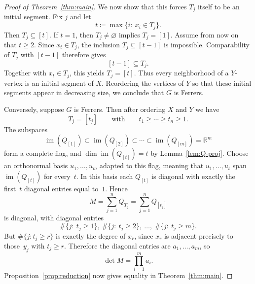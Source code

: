 \documentclass[10pt,a4paper]{amsart}
\newcommand{\RR}{\mathbb R}
\begin{document}
\begin{proof}[Proof of Theorem~\ref{thm:main}]
We now show that this forces $T_j$ itself to be an initial segment. Fix $j$ and let
\[
t\coloneqq \max\{i:\ x_i\in T_j\}.
\]
Then $T_j\subseteq [t]$. If $t=1$, then $T_j\neq\varnothing$ implies $T_j=[1]$. 
Assume from now on that $t\ge 2$. Since $x_t\in T_j$, the inclusion 
$T_j\subseteq [t-1]$ is impossible. Comparability of $T_j$ with $[t-1]$ 
therefore gives
\[
[t-1]\subseteq T_j.
\]
Together with $x_t\in T_j$, this yields $T_j=[t]$. Thus every neighborhood of 
a $Y$-vertex is an initial segment of $X$. Reordering the vertices of $Y$ so 
that these initial segments appear in decreasing size, 
we conclude that $G$ is Ferrers.

Conversely, suppose $G$ is Ferrers. Then after ordering $X$ and $Y$ we have
\[
T_j=[t_j]\qquad\text{with}\qquad t_1\ge\cdots\ge t_n\ge 1.
\]
The subspaces
\[
\operatorname{im}(Q_{[1]})\subset \operatorname{im}(Q_{[2]})
\subset \cdots \subset \operatorname{im}(Q_{[m]})=\RR^m
\]
form a complete flag, and $\dim \operatorname{im}(Q_{[t]})=t$ by 
Lemma~\ref{lem:Q-proj}. Choose an orthonormal basis $u_1,\dots,u_m$ adapted 
to this flag, meaning that $u_1,\dots,u_t$ span $\operatorname{im}(Q_{[t]})$ 
for every~$t$. In this basis each $Q_{[t]}$ is diagonal with exactly the 
first~$t$ diagonal entries equal to~$1$. Hence
\[
M=\sum_{j=1}^n Q_{T_j}=\sum_{j=1}^n Q_{[t_j]}
\]
is diagonal, with diagonal entries
\[
\#\{j:\ t_j\ge 1\},\ \#\{j:\ t_j\ge 2\},\ \dots,\ \#\{j:\ t_j\ge m\}.
\]
But $\#\{j: t_j\ge r\}$ is exactly the degree of $x_r$, since $x_r$ is 
adjacent precisely to those~$y_j$ with $t_j\ge r$. Therefore the diagonal 
entries are $a_1,\dots,a_m$, so
\[
\det M=\prod_{i=1}^m a_i.
\]
Proposition~\ref{prop:reduction} now gives equality in Theorem~\ref{thm:main}.
\end{proof}
\end{document}
